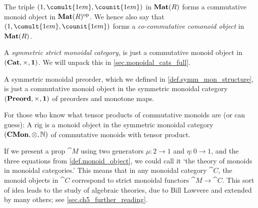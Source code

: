 \documentclass[7Sketches]{subfiles}
\begin{document}
\begin{example}
  The triple $(1,\comult{1em},\counit{1em})$ in $\mathbf{Mat}(R)$ forms a commutative
  monoid object in $\mathbf{Mat}(R)^{\textnormal{op}}$. We hence also say that
  $(1,\comult{1em},\counit{1em})$ forms a \emph{co-commutative comonoid object} in $\mathbf{Mat}(R)$.
\end{example}

\begin{example}
A \emph{symmetric strict monoidal category}, is just a commutative monoid object in
$(\mathbf{Cat},\times,\mathbf{1})$. We will unpack this in \cref{sec.monoidal_cats_full}. %
\end{example}

\begin{example}
A symmetric monoidal preorder, which we defined in
\cref{def.symm_mon_structure}, is just a commutative monoid object in the
symmetric monoidal category $(\mathbf{Preord},\times,\mathbf{1})$ of preorders and
monotone maps.
\end{example}

\begin{example}
For those who know what tensor products of commutative monoids are (or can
guess): A rig is a monoid object in the symmetric monoidal category
$(\mathbf{CMon},\otimes,\mathbb{N})$ of commutative monoids with tensor product.
\end{example}

\begin{remark}%
\label{rem.theory_of_monoids}%
If we present a prop $\cat{M}$ using two generators $\mu\colon 2\to 1$ and
$\eta\colon 0 \to 1$, and the three equations from \cref{def.monoid_object}, we could call it `the theory of monoids in monoidal categories.' This means that in any monoidal category $\cat C$, the monoid objects in $\cat{C}$ correspond
to strict monoidal functors $\cat{M}\to\cat C$. This sort of idea leads to the study of
algebraic theories, due to Bill Lawvere and extended by many others; see
\cref{sec.ch5_further_reading}.%
\end{remark}
\end{document}
